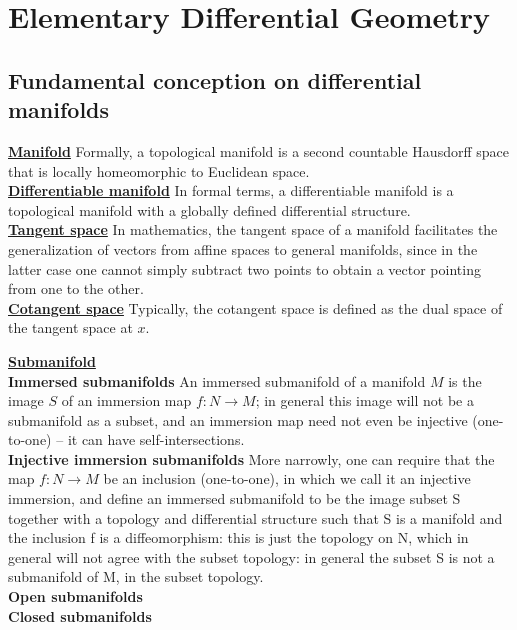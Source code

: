 \chapter{Elementary Differential Geometry}
\section{Fundamental conception on differential manifolds}
\begin{newdef}[Manifold]
\href{https://en.wikipedia.org/wiki/Manifold}{\textbf{Manifold}} 
Formally, a topological manifold is a second countable Hausdorff space that is locally homeomorphic to Euclidean space.\\
\href{https://en.wikipedia.org/wiki/Differentiable_manifold}{\textbf{Differentiable manifold}} 
In formal terms, a differentiable manifold is a topological manifold with a globally defined differential structure. \\
\href{https://en.wikipedia.org/wiki/Tangent_space}{\textbf{Tangent space}} 
In mathematics, the tangent space of a manifold facilitates the generalization of vectors from affine spaces to general manifolds, since in the latter case one cannot simply subtract two points to obtain a vector pointing from one to the other.\\
\href{https://en.wikipedia.org/wiki/Cotangent_space}{\textbf{Cotangent space}} 
Typically, the cotangent space is defined as the dual space of the tangent space at $x$.\\
\end{newdef}

\begin{newdef}[Submanifold]
\href{https://en.wikipedia.org/wiki/Submanifold}{\textbf{Submanifold}}\\
\textbf{Immersed submanifolds} An immersed submanifold of a manifold $M$ is the image $S$ of an immersion map $f:N \to M$; in general this image will not be a submanifold as a subset, and an immersion map need not even be injective (one-to-one) – it can have self-intersections.\\
\textbf{Injective immersion submanifolds} More narrowly, one can require that the map $f:N \to M$ be an inclusion (one-to-one), in which we call it an injective immersion, and define an immersed submanifold to be the image subset S together with a topology and differential structure such that S is a manifold and the inclusion f is a diffeomorphism: this is just the topology on N, which in general will not agree with the subset topology: in general the subset S is not a submanifold of M, in the subset topology.\\
\textbf{Open submanifolds}\\
\textbf{Closed submanifolds}\\
\end{newdef}

